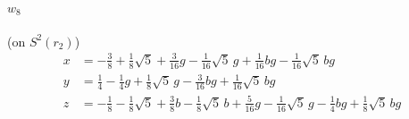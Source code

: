 \documentclass[11pt]{article}
\renewcommand{\_}{\textunderscore\allowbreak}
\theoremstyle{remark}
\begin{document}
{\paragraph{$w_{8}$} (on $S^2(r_2)$)
\begin{align*}
x&=-\tfrac{3}{8}+\tfrac{1}{8}\sqrt5+\tfrac{3}{16}g-\tfrac{1}{16}\sqrt5\,g+\tfrac{1}{16}bg-\tfrac{1}{16}\sqrt5\,bg\\
y&=\tfrac{1}{4}-\tfrac{1}{4}g+\tfrac{1}{8}\sqrt5\,g-\tfrac{3}{16}bg+\tfrac{1}{16}\sqrt5\,bg\\
z&=-\tfrac{1}{8}-\tfrac{1}{8}\sqrt5+\tfrac{3}{8}b-\tfrac{1}{8}\sqrt5\,b+\tfrac{5}{16}g-\tfrac{1}{16}\sqrt5\,g-\tfrac{1}{4}bg+\tfrac{1}{8}\sqrt5\,bg
\end{align*}
}
\end{document}

